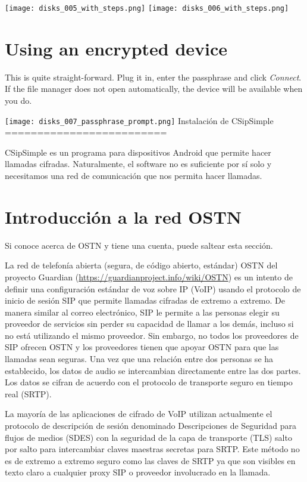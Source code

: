 \documentclass[10pt,a5paper,twoside,,]{book}
\begin{document}
\texttt{[image: disks\_005\_with\_steps.png]}
\texttt{[image: disks\_006\_with\_steps.png]}

\section{Using an encrypted device}\label{using-an-encrypted-device}

This is quite straight-forward. Plug it in, enter the passphrase and
click \emph{Connect}. If the file manager does not open automatically,
the device will be available when you do.

\texttt{[image: disks\_007\_passphrase\_prompt.png]} Instalación de
CSipSimple =========================

CSipSimple es un programa para dispositivos Android que permite hacer
llamadas cifradas. Naturalmente, el software no es suficiente por sí
solo y necesitamos una red de comunicación que nos permita hacer
llamadas.

\section{Introducción a la red
OSTN}\label{introducciuxf3n-a-la-red-ostn}

Si conoce acerca de OSTN y tiene una cuenta, puede saltear esta sección.

La red de telefonía abierta (segura, de código abierto, estándar) OSTN
del proyecto Guardian (\url{https://guardianproject.info/wiki/OSTN}) es
un intento de definir una configuración estándar de voz sobre IP (VoIP)
usando el protocolo de inicio de sesión SIP que permite llamadas
cifradas de extremo a extremo. De manera similar al correo electrónico,
SIP le permite a las personas elegir su proveedor de servicios sin
perder su capacidad de llamar a los demás, incluso si no está utilizando
el mismo proveedor. Sin embargo, no todos los proveedores de SIP ofrecen
OSTN y los proveedores tienen que apoyar OSTN para que las llamadas sean
seguras. Una vez que una relación entre dos personas se ha establecido,
los datos de audio se intercambian directamente entre las dos partes.
Los datos se cifran de acuerdo con el protocolo de transporte seguro en
tiempo real (SRTP).

La mayoría de las aplicaciones de cifrado de VoIP utilizan actualmente
el protocolo de descripción de sesión denominado Descripciones de
Seguridad para flujos de medios (SDES) con la seguridad de la capa de
transporte (TLS) salto por salto para intercambiar claves maestras
secretas para SRTP. Este método no es de extremo a extremo seguro como
las claves de SRTP ya que son visibles en texto claro a cualquier proxy
SIP o proveedor involucrado en la llamada.
\end{document}
